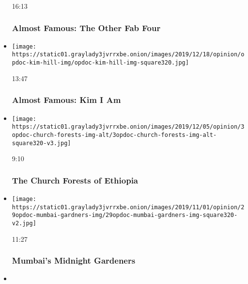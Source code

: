 \begin{itemize}
  16:13

  \hypertarget{almost-famous-the-other-fab-four}{%
  \subsubsection{Almost Famous: The Other Fab
  Four}\label{almost-famous-the-other-fab-four}}
\item
  \href{https://www.nytimes3xbfgragh.onion/video/opinion/100000006865878/almost-famous-kim-i-am.html?action=click\&module=video-series-bar\&region=header\&pgtype=Article\&playlistId=video/op-docs}{}

  \texttt{[image: https://static01.graylady3jvrrxbe.onion/images/2019/12/18/opinion/opdoc-kim-hill-img/opdoc-kim-hill-img-square320.jpg]}

  13:47

  \hypertarget{almost-famous-kim-i-am}{%
  \subsubsection{Almost Famous: Kim I Am}\label{almost-famous-kim-i-am}}
\item
  \href{https://www.nytimes3xbfgragh.onion/video/opinion/100000006808736/the-church-forests-of-ethiopia.html?action=click\&module=video-series-bar\&region=header\&pgtype=Article\&playlistId=video/op-docs}{}

  \texttt{[image: https://static01.graylady3jvrrxbe.onion/images/2019/12/05/opinion/3opdoc-church-forests-img-alt/3opdoc-church-forests-img-alt-square320-v3.jpg]}

  9:10

  \hypertarget{the-church-forests-of-ethiopia}{%
  \subsubsection{The Church Forests of
  Ethiopia}\label{the-church-forests-of-ethiopia}}
\item
  \href{https://www.nytimes3xbfgragh.onion/video/opinion/100000006616228/mumbais-midnight-gardeners.html?action=click\&module=video-series-bar\&region=header\&pgtype=Article\&playlistId=video/op-docs}{}

  \texttt{[image: https://static01.graylady3jvrrxbe.onion/images/2019/11/01/opinion/29opdoc-mumbai-gardners-img/29opdoc-mumbai-gardners-img-square320-v2.jpg]}

  11:27

  \hypertarget{mumbais-midnight-gardeners}{%
  \subsubsection{Mumbai's Midnight
  Gardeners}\label{mumbais-midnight-gardeners}}
\item
  \href{https://www.nytimes3xbfgragh.onion/video/opinion/100000006594650/stay-close.html?action=click\&module=video-series-bar\&region=header\&pgtype=Article\&playlistId=video/op-docs}{}


\end{itemize}
